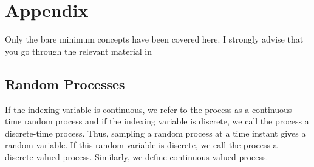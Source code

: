 \documentclass[11pt, a4paper]{report}
\begin{document}



\chapter{Appendix}
Only the bare minimum concepts have been covered here. I strongly advise that you go through the relevant material in \cite{pishro2014introduction}
\section{Random Processes}
If the indexing variable is continuous, we refer to the process as a continuous-time random process and if the indexing variable is discrete, we call the process a discrete-time process. Thus, sampling a random process at a time instant gives a random variable. If this random variable is discrete, we call the process a discrete-valued process. Similarly, we define continuous-valued process. 



\end{document}
